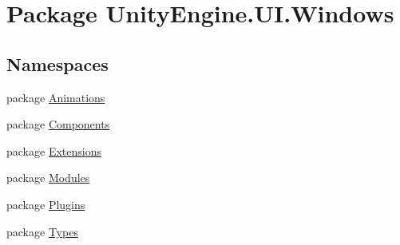 \hypertarget{namespace_unity_engine_1_1_u_i_1_1_windows}{}\section{Package Unity\+Engine.\+U\+I.\+Windows}
\label{namespace_unity_engine_1_1_u_i_1_1_windows}
\subsection*{Namespaces}
\begin{DoxyCompactItemize}
\item 
package \hyperlink{namespace_unity_engine_1_1_u_i_1_1_windows_1_1_animations}{Animations}
\item 
package \hyperlink{namespace_unity_engine_1_1_u_i_1_1_windows_1_1_components}{Components}
\item 
package \hyperlink{namespace_unity_engine_1_1_u_i_1_1_windows_1_1_extensions}{Extensions}
\item 
package \hyperlink{namespace_unity_engine_1_1_u_i_1_1_windows_1_1_modules}{Modules}
\item 
package \hyperlink{namespace_unity_engine_1_1_u_i_1_1_windows_1_1_plugins}{Plugins}
\item 
package \hyperlink{namespace_unity_engine_1_1_u_i_1_1_windows_1_1_types}{Types}
\end{DoxyCompactItemize}

